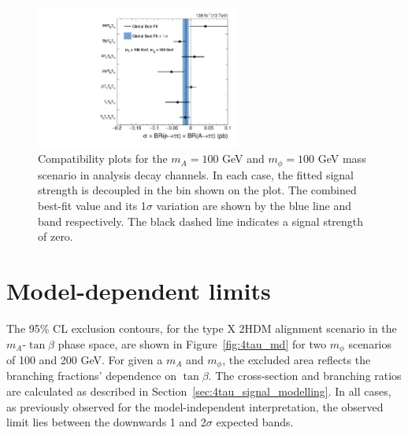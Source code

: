 \begin{figure}[!hbtp]
\centering
    \includegraphics[width=0.6\textwidth]{Figures/ChannelCompatibilityCheck_FitResults_mphi100mA100_channel.pdf}
\caption[Plot of the compatibility of the model-independent results across $\tau\tau\tau\tau$ decay channels.]{Compatibility plots for the $m_{A}=100$ GeV and $m_{\phi}=100$ GeV mass scenario in analysis decay channels. In each case, the fitted signal strength is decoupled in the bin shown on the plot. The combined best-fit value and its 1$\sigma$ variation are shown by the blue line and band respectively. The black dashed line indicates a signal strength of zero.}
\label{fig:4tau_ccc}
\end{figure}

\section{Model-dependent limits}

The 95\% \ac{CL} exclusion contours, for the type X \ac{2HDM} alignment scenario in the $m_A$-$\tan\beta$ phase space, are shown in Figure~\ref{fig:4tau_md} for two $m_{\phi}$ scenarios of 100 and 200 GeV.
For given a $m_{A}$ and $m_{\phi}$, the excluded area reflects the branching fractions' dependence on $\tan\beta$.
The cross-section and branching ratios are calculated as described in Section~\ref{sec:4tau_signal_modelling}.
In all cases, as previously observed for the model-independent interpretation, the observed limit lies between the downwards 1 and 2$\sigma$ expected bands. \\

